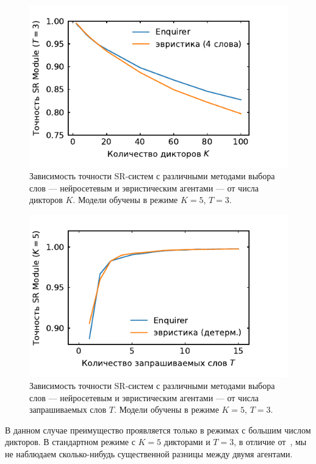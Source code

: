 \begin{figure}[htb]
    \centering
    \includegraphics[scale=1.0]{../plots/guest_sweep_heuristic.pdf}
    \caption{Зависимость точности SR-систем с различными методами выбора слов
    --- нейросетевым и эвристическим агентами --- от
    числа дикторов $K$. Модели обучены в режиме $K = 5$, $T = 3$.}
\end{figure}

\begin{figure}[htb]
    \centering
    \includegraphics[scale=1.0]{../plots/word_sweep_heuristic.pdf}
    \caption{Зависимость точности SR-систем с различными методами выбора слов
    --- нейросетевым и эвристическим агентами --- от
    числа запрашиваемых слов $T$. Модели обучены в режиме $K = 5$, $T = 3$.}
\end{figure}

В данном случае преимущество \enquirer{} проявляется только в режимах с большим
числом дикторов. В стандартном режиме с $K = 5$ дикторами и $T = 3$, в отличие
от~\citeisr{}, мы не наблюдаем сколько-нибудь существенной разницы между двумя
агентами.

